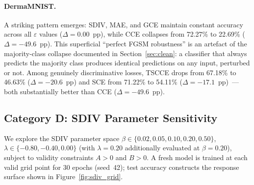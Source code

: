 \paragraph{DermaMNIST.}
A striking pattern emerges: SDIV, MAE, and GCE maintain constant accuracy
across all $\varepsilon$ values ($\Delta{=}0.00$~pp), while CCE collapses
from 72.27\% to 22.69\% ($\Delta{=}{-49.6}$~pp).
This superficial ``perfect FGSM robustness'' is an artefact of the
majority-class collapse documented in Section~\ref{sec:clean}:
a classifier that always predicts the majority class produces identical
predictions on any input, perturbed or not.
Among genuinely discriminative losses, TSCCE drops from
67.18\% to 46.63\% ($\Delta{=}{-20.6}$~pp) and
SCE from 71.22\% to 54.11\% ($\Delta{=}{-17.1}$~pp)~---
both substantially better than CCE ($\Delta{=}{-49.6}$~pp).

\subsection{Category D: SDIV Parameter Sensitivity}
\label{sec:surface}

We explore the SDIV parameter space
$\beta \in \{0.02, 0.05, 0.10, 0.20, 0.50\}$,
$\lambda \in \{-0.80, -0.40, 0.00\}$ (with $\lambda{=}0.20$ additionally
evaluated at $\beta{=}0.20$),
subject to validity constraints $A>0$ and $B>0$.
A fresh model is trained at each valid grid point for 30 epochs (seed~42);
test accuracy constructs the response surface shown in Figure~\ref{fig:sdiv_grid}.

